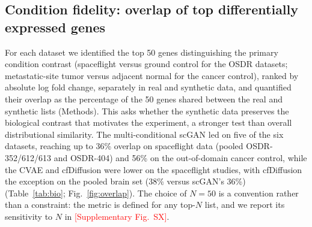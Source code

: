 \documentclass[11pt]{article}
\newcommand{\res}[1]{\textcolor{red}{[#1]}}
\begin{document}
\subsection{Condition fidelity: overlap of top differentially expressed genes}
For each dataset we identified the top 50 genes distinguishing the primary condition contrast (spaceflight versus ground control for the OSDR datasets; metastatic-site tumor versus adjacent normal for the cancer control), ranked by absolute log fold change, separately in real and synthetic data, and quantified their overlap as the percentage of the 50 genes shared between the real and synthetic lists (Methods). This asks whether the synthetic data preserves the biological contrast that motivates the experiment, a stronger test than overall distributional similarity. The multi-conditional scGAN led on five of the six datasets, reaching up to 36\% overlap on spaceflight data (pooled OSDR-352/612/613 and OSDR-404) and 56\% on the out-of-domain cancer control, while the CVAE and cfDiffusion were lower on the spaceflight studies, with cfDiffusion the exception on the pooled brain set (38\% versus scGAN's 36\%) (Table~\ref{tab:bio}; Fig.~\ref{fig:overlap}). The choice of $N=50$ is a convention rather than a constraint: the metric is defined for any top-$N$ list, and we report its sensitivity to $N$ in \res{Supplementary Fig.\ SX}.
\end{document}
